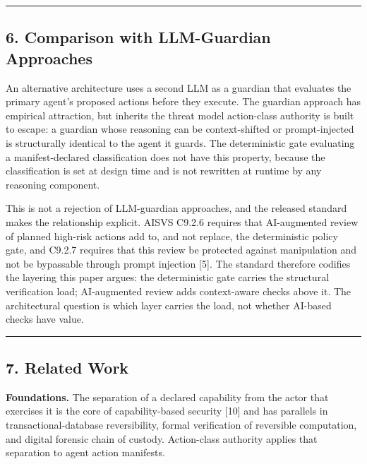 \documentclass[
  11pt,
]{article}
\begin{document}
\begin{center}\rule{0.5\linewidth}{0.5pt}\end{center}

\subsection{6. Comparison with LLM-Guardian
Approaches}\label{comparison-with-llm-guardian-approaches}

An alternative architecture uses a second LLM as a guardian that
evaluates the primary agent's proposed actions before they execute. The
guardian approach has empirical attraction, but inherits the threat
model action-class authority is built to escape: a guardian whose
reasoning can be context-shifted or prompt-injected is structurally
identical to the agent it guards. The deterministic gate evaluating a
manifest-declared classification does not have this property, because
the classification is set at design time and is not rewritten at runtime
by any reasoning component.

This is not a rejection of LLM-guardian approaches, and the released
standard makes the relationship explicit. AISVS C9.2.6 requires that
AI-augmented review of planned high-risk actions add to, and not
replace, the deterministic policy gate, and C9.2.7 requires that this
review be protected against manipulation and not be bypassable through
prompt injection {[}5{]}. The standard therefore codifies the layering
this paper argues: the deterministic gate carries the structural
verification load; AI-augmented review adds context-aware checks above
it. The architectural question is which layer carries the load, not
whether AI-based checks have value.

\begin{center}\rule{0.5\linewidth}{0.5pt}\end{center}

\subsection{7. Related Work}\label{related-work}

\textbf{Foundations.} The separation of a declared capability from the
actor that exercises it is the core of capability-based security
{[}10{]} and has parallels in transactional-database reversibility,
formal verification of reversible computation, and digital forensic
chain of custody. Action-class authority applies that separation to
agent action manifests.
\end{document}
